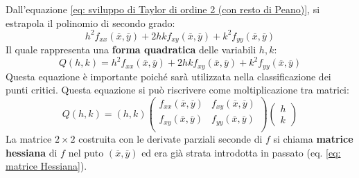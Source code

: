 \documentclass[a4paper]{article}
\newcommand{\definition}[1]{\textcolor{Red3}{\textbf{#1}}}
\begin{document}
	\noindent
	Dall'equazione \ref{eq: sviluppo di Taylor di ordine 2 (con resto di Peano)}, si estrapola il polinomio di secondo grado:
	\begin{equation*}
		h^{2} f_{xx}\left(\overline{x},\overline{y}\right) + 2 h k f_{xy}\left(\overline{x},\overline{y}\right) + k^{2} f_{yy}\left(\overline{x},\overline{y}\right)
	\end{equation*}
	Il quale rappresenta una \textbf{forma quadratica} delle variabili $h,k$:
	\begin{equation}\label{eq: forma quadratica dello sviluppo di Taylor}
		Q\left(h,k\right) = h^{2} f_{xx}\left(\overline{x},\overline{y}\right) + 2 h k f_{xy}\left(\overline{x},\overline{y}\right) + k^{2} f_{yy}\left(\overline{x},\overline{y}\right)
	\end{equation}
	Questa equazione è importante poiché sarà utilizzata nella classificazione dei punti critici. Questa equazione si può riscrivere come moltiplicazione tra matrici:
	\begin{equation}
		Q\left(h,k\right) = 
		\left(h,k\right) 
		\begin{pmatrix}
			f_{xx}\left(\overline{x}, \overline{y}\right) & f_{xy}\left(\overline{x}, \overline{y}\right) \\
			f_{xy}\left(\overline{x}, \overline{y}\right) & f_{yy}\left(\overline{x}, \overline{y}\right) \\
		\end{pmatrix}
		\begin{pmatrix}
			h \\ k
		\end{pmatrix}
	\end{equation}
	La matrice $2 \times 2$ costruita con le derivate parziali seconde di $f$ si chiama \definition{matrice hessiana} di $f$ nel puto $\left(\overline{x}, \overline{y}\right)$ ed era già strata introdotta in passato (eq. \ref{eq: matrice Hessiana}).\newline
\end{document}
